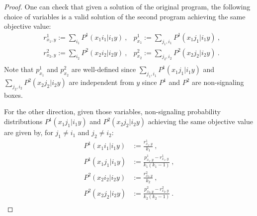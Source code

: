 \begin{proof}
  One can check that given a solution of the original program, the following choice of variables is a valid solution of the second program achieving the same objective value:
\begin{equation}
  \begin{aligned}
    &r^1_{x_1,y} := \sum_{i_1} P^1(x_1i_1|i_1y) \ , &p^1_{x_1} := \sum_{j_1,i_1} P^1(x_1j_1|i_1y) \ ,\\
    &r^2_{x_2,y} := \sum_{i_2} P^2(x_2i_2|i_2y) \ , &p^2_{x_2} := \sum_{j_2,i_2} P^2(x_2j_2|i_2y) \ .\\
  \end{aligned}
\end{equation}
Note that $p^1_{x_1}$ and $p^2_{x_2}$ are well-defined since  $\sum_{j_1,i_1} P^1(x_1j_1|i_1y)$ and $\sum_{j_2,i_2} P^2(x_2j_2|i_2y)$ are independent from $y$ since $P^1$ and $P^2$ are non-signaling boxes.

For the other direction, given those variables, non-signaling probability distributions $P^1(x_1j_1|i_1y)$ and $P^2(x_2j_2|i_2y)$ achieving the same objective value are given by, for $j_1 \not=i_1$ and $j_2 \not= i_2$:
\begin{equation}
  \begin{aligned}
    P^1(x_1i_1|i_1y) &:= \frac{r^1_{x_1,y}}{k_1} \ ,\\
    P^1(x_1j_1|i_1y) &:= \frac{p^1_{x_1,y} - r^1_{x_1,y}}{k_1(k_1-1)} \ ,\\
    P^2(x_2i_2|i_2y) &:= \frac{r^2_{x_2,y}}{k_2} \ ,\\
    P^2(x_2j_2|i_2y) &:= \frac{p^2_{x_2,y} - r^2_{x_2,y}}{k_2(k_2-1)} \ .\\
  \end{aligned}
\end{equation}
\end{proof}

